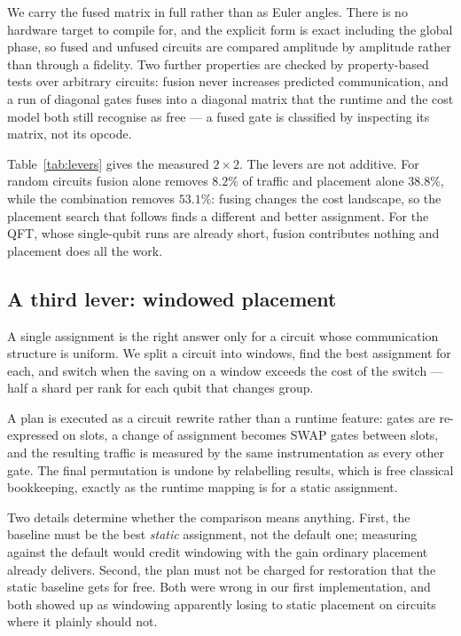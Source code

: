 \documentclass[11pt]{article}
\begin{document}
We carry the fused matrix in full rather than as Euler angles. There is no
hardware target to compile for, and the explicit form is exact including the
global phase, so fused and unfused circuits are compared amplitude by
amplitude rather than through a fidelity. Two further properties are checked
by property-based tests over arbitrary circuits: fusion never increases
predicted communication, and a run of diagonal gates fuses into a diagonal
matrix that the runtime and the cost model both still recognise as free --- a
fused gate is classified by inspecting its matrix, not its opcode.



Table~\ref{tab:levers} gives the measured $2\times2$. The levers are not
additive. For random circuits fusion alone removes $8.2\%$ of traffic and
placement alone $38.8\%$, while the combination removes $53.1\%$: fusing
changes the cost landscape, so the placement search that follows finds a
different and better assignment. For the QFT, whose single-qubit runs are
already short, fusion contributes nothing and placement does all the work.

\subsection{A third lever: windowed placement}

A single assignment is the right answer only for a circuit whose communication
structure is uniform. We split a circuit into windows, find the best
assignment for each, and switch when the saving on a window exceeds the cost
of the switch --- half a shard per rank for each qubit that changes group.

A plan is executed as a circuit rewrite rather than a runtime feature: gates
are re-expressed on slots, a change of assignment becomes SWAP gates between
slots, and the resulting traffic is measured by the same instrumentation as
every other gate. The final permutation is undone by relabelling results,
which is free classical bookkeeping, exactly as the runtime mapping is for a
static assignment.

Two details determine whether the comparison means anything. First, the
baseline must be the best \emph{static} assignment, not the default one;
measuring against the default would credit windowing with the gain ordinary
placement already delivers. Second, the plan must not be charged for
restoration that the static baseline gets for free. Both were wrong in our
first implementation, and both showed up as windowing apparently losing to
static placement on circuits where it plainly should not.
\end{document}
